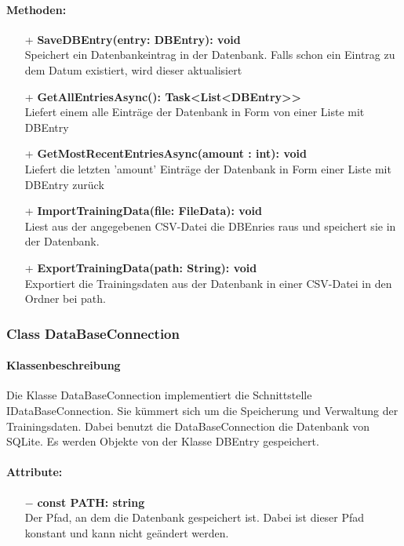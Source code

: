 \documentclass[a4paper,12pt]{article}
\begin{document}
	\paragraph{Methoden:}
	\begin{itemize}
		\item[+] \textbf{SaveDBEntry(entry: DBEntry): void}\\Speichert ein Datenbankeintrag in der \gls{Datenbank}. Falls schon ein Eintrag zu dem Datum existiert, wird dieser aktualisiert\\
		\item[+] \textbf{GetAllEntriesAsync(): Task<List<DBEntry>>}\\Liefert einem alle Einträge der Datenbank in Form von einer Liste mit DBEntry \\ 
		\item[+] \textbf{GetMostRecentEntriesAsync(amount : int): void}\\Liefert  die letzten 'amount' Einträge der Datenbank in Form einer Liste mit DBEntry zurück\\
		\item[+] \textbf{ImportTrainingData(file: FileData): void}\\Liest aus der angegebenen \gls{CSV}-Datei die DBEnries raus und speichert sie in der \gls{Datenbank}.\\
		\item[+] \textbf{ExportTrainingData(path: String): void}\\Exportiert die Trainingsdaten aus der \gls{Datenbank} in einer \gls{CSV}-Datei in den Ordner bei path. \\
	\end{itemize}

\subsubsection{Class DataBaseConnection}
	\paragraph{Klassenbeschreibung}
	Die Klasse DataBaseConnection implementiert die Schnittstelle IDataBaseConnection. Sie kümmert sich um die Speicherung und Verwaltung der Trainingsdaten. Dabei benutzt die DataBaseConnection die \gls{Datenbank} von SQLite. Es werden Objekte von der Klasse DBEntry gespeichert. 
	
	\paragraph{Attribute:}
	\begin{itemize}
		\item[$-$] \textbf{const PATH: string}\\Der Pfad, an dem die Datenbank gespeichert ist. Dabei ist dieser Pfad konstant und kann nicht geändert werden.
	\end{itemize}
\end{document}
